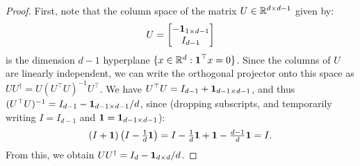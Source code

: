 \documentclass[eikonal.tex]{subfiles}
\begin{document}
\begin{proof}
  First, note that the column space of the matrix
  $U \in \mathbb{R}^{d \times d - 1}$ given by:
  \begin{align*}
    U = \begin{bmatrix} -\boldsymbol{1}_{1 \times d - 1} \\ I_{d-1} \end{bmatrix}
  \end{align*}
  is the dimension $d-1$ hyperplane
  $\{x \in \mathbb{R}^d : \boldsymbol{1}^\top x = 0\}$. Since the columns of $U$ are
  linearly independent, we can write the orthogonal projector onto
  this space as $UU^\dagger = U(U^\top U)^{-1}U^\top$. We have
  $U^\top U = I_{d-1} + \boldsymbol{1}_{d-1 \times d-1}$, and thus
  $(U^\top U)^{-1} = I_{d-1} - \boldsymbol{1}_{d-1 \times d-1}/d$, since
  (dropping subscripts, and temporarily writing $I = I_{d-1}$ and
  $\boldsymbol{1} = \boldsymbol{1}_{d-1 \times d-1}$):
  \begin{align*}
    \left(I + \boldsymbol{1}\right) \left(I - \tfrac{1}{d}\boldsymbol{1}\right) = I - \tfrac{1}{d} \boldsymbol{1} + \boldsymbol{1} - \tfrac{d-1}{d} \boldsymbol{1} = I.
  \end{align*}
  From this, we obtain $UU^\dagger = I_d - \boldsymbol{1}_{d \times d}/d$.


\end{proof}
\end{document}
